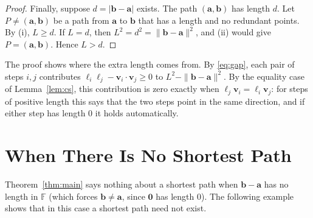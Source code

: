 \documentclass[11pt]{article}
\theoremstyle{plain}
\theoremstyle{definition}
\theoremstyle{remark}
\begin{document}
\begin{proof}
Finally, suppose $d = |\mathbf{b} - \mathbf{a}|$ exists. The path $(\mathbf{a}, \mathbf{b})$ has length $d$. Let $P \neq (\mathbf{a}, \mathbf{b})$ be a path from $\mathbf{a}$ to $\mathbf{b}$ that has a length and no redundant points. By (i), $L \geq d$. If $L = d$, then $L^2 = d^2 = \|\mathbf{b} - \mathbf{a}\|^2$, and (ii) would give $P = (\mathbf{a}, \mathbf{b})$. Hence $L > d$.
\end{proof}

The proof shows where the extra length comes from. By \eqref{eq:gap}, each pair of steps $i, j$ contributes $\ell_i \ell_j - \mathbf{v}_i \cdot \mathbf{v}_j \geq 0$ to $L^2 - \|\mathbf{b} - \mathbf{a}\|^2$. By the equality case of Lemma~\ref{lem:cs}, this contribution is zero exactly when $\ell_j \mathbf{v}_i = \ell_i \mathbf{v}_j$: for steps of positive length this says that the two steps point in the same direction, and if either step has length $0$ it holds automatically.

\section{When There Is No Shortest Path}\label{sec:noshortest}

Theorem~\ref{thm:main} says nothing about a shortest path when $\mathbf{b} - \mathbf{a}$ has no length in $\mathbb{F}$ (which forces $\mathbf{b} \neq \mathbf{a}$, since $\mathbf{0}$ has length $0$). The following example shows that in this case a shortest path need not exist.
\end{document}
